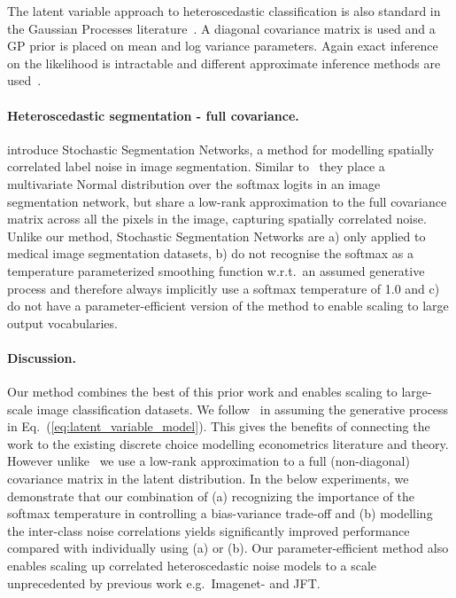 \documentclass[final]{cvpr}
\begin{document}
The latent variable approach to heteroscedastic classification is also standard in the Gaussian Processes literature~\cite{hernandez2014mind,williams2006gaussian}. A diagonal covariance matrix is used and a GP prior is placed on mean and log variance parameters. Again exact inference on the likelihood is intractable and different approximate inference methods are used~\cite{hernandez2014mind}.

\paragraph{Heteroscedastic segmentation - full covariance.}
\citet{monteiro2020stochastic} introduce Stochastic Segmentation Networks, a method for modelling spatially correlated label noise in image segmentation. Similar to~\citet{kendall2017uncertainties} they place a multivariate Normal distribution over the softmax logits in an image segmentation network, but share a low-rank approximation to the full covariance matrix across all the pixels in the image, capturing spatially correlated noise. Unlike our method, Stochastic Segmentation Networks are a) only applied to medical image segmentation datasets, b) do not recognise the softmax as a temperature parameterized smoothing function w.r.t.\ an assumed generative process and therefore always implicitly use a softmax temperature of 1.0 and c) do not have a parameter-efficient version of the method to enable scaling to large output vocabularies.

\paragraph{Discussion.}
Our method combines the best of this prior work and enables scaling to large-scale image classification datasets. We follow~\citet{collier2020analysis} in assuming the generative process in Eq.\ (\ref{eq:latent_variable_model}). This gives the benefits of connecting the work to the existing discrete choice modelling econometrics literature and theory. However unlike~\citet{collier2020analysis} we use a low-rank approximation to a full (non-diagonal) covariance matrix in the latent distribution. In the below experiments, we demonstrate that our combination of (a) recognizing the importance of the softmax temperature in controlling a bias-variance trade-off and (b) modelling the inter-class noise correlations yields significantly improved performance compared with individually using (a) or (b). Our parameter-efficient method also enables scaling up correlated heteroscedastic noise models to a scale unprecedented by previous work e.g.\ Imagenet- and JFT.
\end{document}
